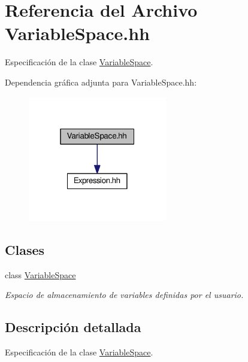\hypertarget{_variable_space_8hh}{}\section{Referencia del Archivo Variable\+Space.\+hh}
\label{_variable_space_8hh}


Especificación de la clase \hyperlink{class_variable_space}{Variable\+Space}.  


Dependencia gráfica adjunta para Variable\+Space.\+hh\+:
\nopagebreak
\begin{figure}[H]
\begin{center}
\leavevmode
\includegraphics[width=172pt]{_variable_space_8hh__incl}
\end{center}
\end{figure}
\subsection*{Clases}
\begin{DoxyCompactItemize}
\item 
class \hyperlink{class_variable_space}{Variable\+Space}
\begin{DoxyCompactList}\small\item\em Espacio de almacenamiento de variables definidas por el usuario. \end{DoxyCompactList}\end{DoxyCompactItemize}


\subsection{Descripción detallada}
Especificación de la clase \hyperlink{class_variable_space}{Variable\+Space}. 

